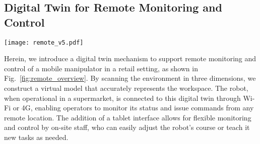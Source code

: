 \subsection{Digital Twin for Remote Monitoring and Control}
\label{sec:digital_twin}

\begin{figure*}[t]
  \begin{center}
    \texttt{[image: remote\_v5.pdf]}
  \end{center}
  \caption{Overview of the remote monitoring and control system. a) Laptop-based remote interface for monitoring and control system; b) Visualization of the robot within the actual retail environment; c) Tablet interface for on-the-go monitoring and task programming}\label{fig:remote_overview}
\end{figure*}

Herein, we introduce a digital twin mechanism to support remote monitoring and control of a mobile manipulator in a retail setting, as shown in Fig.~\ref{fig:remote_overview}. By scanning the environment in three dimensions, we construct a virtual model that accurately represents the workspace. The robot, when operational in a supermarket, is connected to this digital twin through Wi-Fi or 4G, enabling operators to monitor its status and issue commands from any remote location. The addition of a tablet interface allows for flexible monitoring and control by on-site staff, who can easily adjust the robot's course or teach it new tasks as needed.



